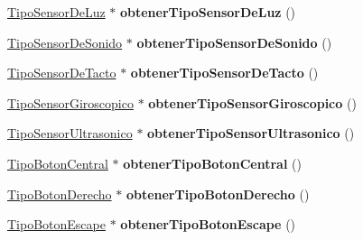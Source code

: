 \begin{DoxyCompactItemize}
\item 
\hypertarget{class_programa_a817ae26c8bcd38b31d89702b91c19520}{\hyperlink{class_tipo_sensor_de_luz}{Tipo\-Sensor\-De\-Luz} $\ast$ {\bfseries obtener\-Tipo\-Sensor\-De\-Luz} ()}\label{class_programa_a817ae26c8bcd38b31d89702b91c19520}

\item 
\hypertarget{class_programa_aa47d56af0aea5d1f77e102a7b7d42e0e}{\hyperlink{class_tipo_sensor_de_sonido}{Tipo\-Sensor\-De\-Sonido} $\ast$ {\bfseries obtener\-Tipo\-Sensor\-De\-Sonido} ()}\label{class_programa_aa47d56af0aea5d1f77e102a7b7d42e0e}

\item 
\hypertarget{class_programa_a1cd06250f7d285fa09238102c16288b1}{\hyperlink{class_tipo_sensor_de_tacto}{Tipo\-Sensor\-De\-Tacto} $\ast$ {\bfseries obtener\-Tipo\-Sensor\-De\-Tacto} ()}\label{class_programa_a1cd06250f7d285fa09238102c16288b1}

\item 
\hypertarget{class_programa_ac1c79a7013da69fe4093a6076dfe5fb4}{\hyperlink{class_tipo_sensor_giroscopico}{Tipo\-Sensor\-Giroscopico} $\ast$ {\bfseries obtener\-Tipo\-Sensor\-Giroscopico} ()}\label{class_programa_ac1c79a7013da69fe4093a6076dfe5fb4}

\item 
\hypertarget{class_programa_af201142aced199e168b8e73a5647723a}{\hyperlink{class_tipo_sensor_ultrasonico}{Tipo\-Sensor\-Ultrasonico} $\ast$ {\bfseries obtener\-Tipo\-Sensor\-Ultrasonico} ()}\label{class_programa_af201142aced199e168b8e73a5647723a}

\item 
\hypertarget{class_programa_a285a789607fb515d4b32975a42f6f1cc}{\hyperlink{class_tipo_boton_central}{Tipo\-Boton\-Central} $\ast$ {\bfseries obtener\-Tipo\-Boton\-Central} ()}\label{class_programa_a285a789607fb515d4b32975a42f6f1cc}

\item 
\hypertarget{class_programa_a64ffbd3f1f579bab1ab766e28cbc61ba}{\hyperlink{class_tipo_boton_derecho}{Tipo\-Boton\-Derecho} $\ast$ {\bfseries obtener\-Tipo\-Boton\-Derecho} ()}\label{class_programa_a64ffbd3f1f579bab1ab766e28cbc61ba}

\item 
\hypertarget{class_programa_a62394548fafc416edfc0678d9978df0f}{\hyperlink{class_tipo_boton_escape}{Tipo\-Boton\-Escape} $\ast$ {\bfseries obtener\-Tipo\-Boton\-Escape} ()}\label{class_programa_a62394548fafc416edfc0678d9978df0f}


\end{DoxyCompactItemize}
